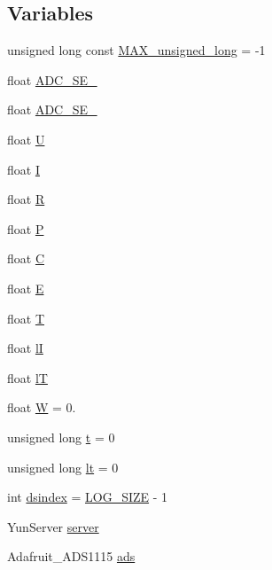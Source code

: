 \subsection*{Variables}
\begin{DoxyCompactItemize}
\item 
unsigned long const \hyperlink{Yun__Log__BatteryDisCharging_8ino_a6dd369301966212a72933d8eba0ebd3a}{M\-A\-X\-\_\-unsigned\-\_\-long} = -\/1
\item 
float \hyperlink{Yun__Log__BatteryDisCharging_8ino_a8f2c77de8b5910e2168c7b6e794c1141}{A\-D\-C\-\_\-\-S\-E\-\_}
\item 
float \hyperlink{Yun__Log__BatteryDisCharging_8ino_a922597e564c95f237afa79daf988bf95}{A\-D\-C\-\_\-\-S\-E\-\_}
\item 
float \hyperlink{Yun__Log__BatteryDisCharging_8ino_a0960ce8ee4607f26fa67f51c52f1877c}{U}
\item 
float \hyperlink{Yun__Log__BatteryDisCharging_8ino_a145f61de888f096c52a2945234a407b0}{I}
\item 
float \hyperlink{Yun__Log__BatteryDisCharging_8ino_a4c4b08e61e92b3da1ed512f4e006f34a}{R}
\item 
float \hyperlink{Yun__Log__BatteryDisCharging_8ino_aca74a684c7823144d7962beb8397621e}{P}
\item 
float \hyperlink{Yun__Log__BatteryDisCharging_8ino_ad12b105c602c51bd04d7763f600688cc}{C}
\item 
float \hyperlink{Yun__Log__BatteryDisCharging_8ino_a5b514bbfa4713e7bcf9c6a367cb6ebfe}{E}
\item 
float \hyperlink{Yun__Log__BatteryDisCharging_8ino_a1e59dd36aafb310776e617456b9415b5}{T}
\item 
float \hyperlink{Yun__Log__BatteryDisCharging_8ino_a4c17110c175ad4cdef6032380a75d07f}{l\-I}
\item 
float \hyperlink{Yun__Log__BatteryDisCharging_8ino_abcf1aea01531d862fc51a7176f488cd0}{l\-T}
\item 
float \hyperlink{Yun__Log__BatteryDisCharging_8ino_a9f617b4ebd9b59cdac29c77f13ace604}{W} = 0.
\item 
unsigned long \hyperlink{Yun__Log__BatteryDisCharging_8ino_a1ffe6f4d89de83b8119fa91af85fcacc}{t} = 0
\item 
unsigned long \hyperlink{Yun__Log__BatteryDisCharging_8ino_a2aac88b4c9f4551e8e925efe260fea56}{lt} = 0
\item 
int \hyperlink{Yun__Log__BatteryDisCharging_8ino_ab2bf23fcd6f167325f76f030a9da6298}{dsindex} = \hyperlink{Yun__Log__BatteryDisCharging_8ino_a609a6de2c7ff0a69b55d3b3c5e260cc5}{L\-O\-G\-\_\-\-S\-I\-Z\-E} -\/ 1
\item 
Yun\-Server \hyperlink{Yun__Log__BatteryDisCharging_8ino_a4e0c9ea4f8c666a7b51971ca06aae4e0}{server}
\item 
Adafruit\-\_\-\-A\-D\-S1115 \hyperlink{Yun__Log__BatteryDisCharging_8ino_a951ac31de71c2bf701a13e5f233fc6d8}{ads}
\end{DoxyCompactItemize}


